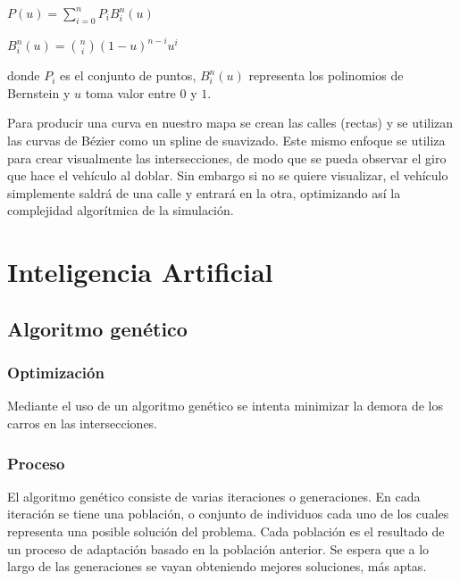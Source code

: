 \documentclass[colorinlistoftodos,twoside,twocolumn]{article} %
\begin{document}
	\begin{center}
		$ P(u) = \sum_{i=0}^{n} P_{i}B_{i}^{n}(u) $
	\end{center}
	\begin{center}
		$ B_{i}^{n}(u) = \binom{n}{i} (1 - u)^{n-i}u^{i} $
	\end{center}
	donde $ P_{i} $ es el conjunto de puntos, $ B_{i}^{n}(u) $ representa los polinomios de Bernstein y $ u $ toma valor entre $ 0 $ y $ 1 $.

	Para producir una curva en nuestro mapa se crean las calles (rectas) y se utilizan las curvas de B\'ezier como un spline de suavizado. Este mismo enfoque se utiliza para crear visualmente las intersecciones, de modo que se pueda observar el giro que hace el veh\'iculo al doblar. Sin embargo si no se quiere visualizar, el veh\'iculo simplemente saldr\'a de una calle y entrar\'a en la otra, optimizando as\'i la complejidad algor\'itmica de la simulaci\'on.
	
	
	\section{Inteligencia Artificial}
	
	\subsection{Algoritmo genético}
	
	\subsubsection{Optimizaci\'on}
	
	Mediante el uso de un algoritmo gen\'etico se intenta minimizar la demora de los carros en las intersecciones. 
	
	\subsubsection{Proceso}
	
	El algoritmo gen\'etico consiste de varias iteraciones o generaciones. En cada iteraci\'on se tiene una poblaci\'on, o conjunto de individuos cada uno de los cuales representa una posible soluci\'on del problema. Cada poblaci\'on es el resultado de un proceso de adaptaci\'on basado en la poblaci\'on anterior. Se espera que a lo largo de las generaciones se vayan obteniendo mejores soluciones, m\'as aptas.
	
\end{document}
